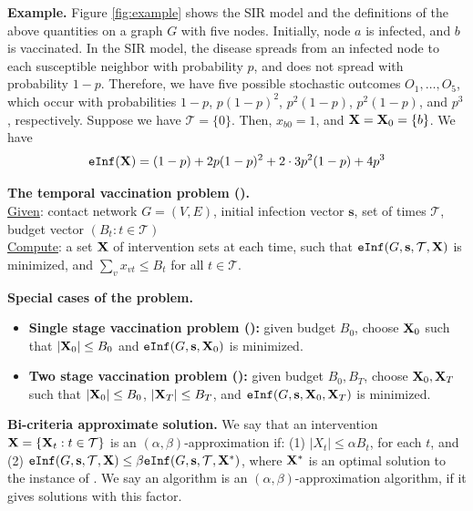 \noindent
\textbf{Example.} Figure \ref{fig:example} shows the SIR model and the definitions of the above quantities
on a graph $G$ with five nodes. Initially, node $a$ is infected, and $b$ is vaccinated. 
In the SIR model, the disease spreads from an infected node to each susceptible neighbor with probability $p$,
and does not spread with probability $1-p$. Therefore, we have five possible stochastic outcomes $O_1,\ldots,O_5$,
which occur with probabilities $1-p$, $p(1-p)^2$, $p^2(1-p)$, $p^2(1-p)$, and $p^3$, respectively.
Suppose we have $\mathcal{T}=\{0\}$. Then, $x_{b0}=1$, and $\mathbf{X}=\mathbf{X}_0=\{b\}$.
We have 
\[
\texttt{eInf}(\mathbf{X})= (1-p) +2p(1-p)^2+2\cdot 3 p^2(1-p) + 4p^3
\]

\noindent
\textbf{The temporal vaccination problem (\prob).}\\
\underline{Given}: contact network $G=(V, E)$, initial infection vector $\mathbf{s}$, set of times $\mathcal{T}$,
budget vector $(B_t: t\in\mathcal{T})$\\
\underline{Compute}: a set $\mathbf{X}$ of intervention sets at each time, 
such that $\texttt{eInf}(G, \mathbf{s}, \mathcal{T}, \mathbf{X})$ is minimized, and $\sum_v x_{vt} \leq B_t$ for all $t\in\mathcal{T}$.

\noindent
\textbf{Special cases of the \prob{} problem.}
\begin{itemize}
\item
\textbf{Single stage vaccination problem (\probone):} given budget $B_0$, choose $\mathbf{X}_0$ such that $|\mathbf{X}_0|\leq B_0$
and $\texttt{eInf}(G, \mathbf{s}, \mathbf{X}_0)$ is minimized.
\item
\textbf{Two stage vaccination problem (\probtwo):} given budget $B_0, B_T$, choose $\mathbf{X}_0, \mathbf{X}_T$ such that
$|\mathbf{X}_0|\leq B_0$, $|\mathbf{X}_T|\leq B_T$, and $\texttt{eInf}(G, \mathbf{s}, \mathbf{X}_0, \mathbf{X}_T)$ is minimized.
\end{itemize}

\noindent
\textbf{Bi-criteria approximate solution.}
We say that an intervention $\mathbf{X}=\{\mathbf{X}_t: t\in\mathcal{T}\}$ is an $(\alpha, \beta)$-approximation if:
(1) $|X_t|\leq \alpha B_t$, for each $t$, and
(2) $\texttt{eInf}(G, \mathbf{s}, \mathcal{T}, \mathbf{X})\leq \beta \texttt{eInf}(G, \mathbf{s}, \mathcal{T}, \mathbf{X}^*)$, where
$\mathbf{X}^*$ is an optimal solution to the instance of \prob{}.
We say an algorithm is an $(\alpha, \beta)$-approximation algorithm, if it gives solutions with this factor.

